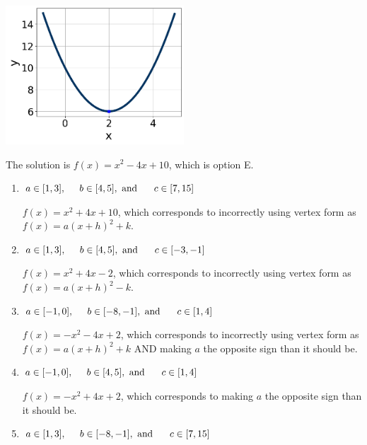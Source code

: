 \documentclass{extbook}[14pt]
\begin{document}
\begin{enumerate}
{\begin{center}
    \includegraphics[width=0.5\textwidth]{../Figures/quadraticGraphToEquationC.png}
\end{center}


The solution is \( f(x) = x^{2} -4 x + 10 \), which is option E.\begin{enumerate}[label=\Alph*.]
\item \( a \in [1, 3], \hspace*{5mm} b \in [4, 5], \text{ and } \hspace*{5mm} c \in [7, 15] \)

$f(x)=x^{2} +4 x + 10$, which corresponds to incorrectly using vertex form as $f(x) = a(x+h)^2+k$.
\item \( a \in [1, 3], \hspace*{5mm} b \in [4, 5], \text{ and } \hspace*{5mm} c \in [-3, -1] \)

$f(x)=x^{2} +4 x -2$, which corresponds to incorrectly using vertex form as $f(x) = a(x+h)^2 - k$.
\item \( a \in [-1, 0], \hspace*{5mm} b \in [-8, -1], \text{ and } \hspace*{5mm} c \in [1, 4] \)

$f(x)=-x^{2} -4 x + 2$, which corresponds to incorrectly using vertex form as $f(x) = a(x+h)^2+k$ AND making $a$ the opposite sign than it should be.
\item \( a \in [-1, 0], \hspace*{5mm} b \in [4, 5], \text{ and } \hspace*{5mm} c \in [1, 4] \)

$f(x)=-x^{2} +4 x + 2$, which corresponds to making $a$ the opposite sign than it should be.
\item \( a \in [1, 3], \hspace*{5mm} b \in [-8, -1], \text{ and } \hspace*{5mm} c \in [7, 15] \)


\end{enumerate}}
\end{enumerate}
\end{document}
